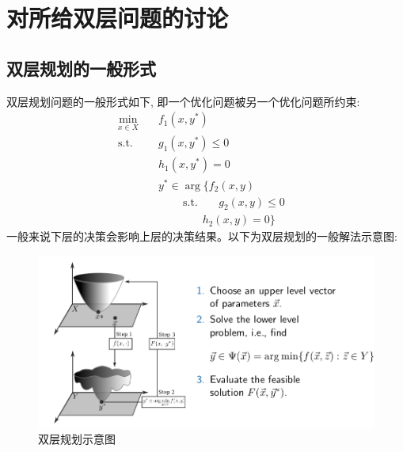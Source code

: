 \documentclass{article}
\begin{document}
\section{对所给双层问题的讨论}
\subsection{双层规划的一般形式}
双层规划问题的一般形式如下, 即一个优化问题被另一个优化问题所约束:
\begin{align}
    \min_{x\in X}\quad & f_1(x,y^{*})&  \\
    \mathrm{s.t.}\quad &g_{1}(x,y^{*})\leq0&  \\
    &h_{1}(x,y^{*})=0& \\
    &y^*\in\mathop{\arg\min_{y\in Y}}\{f_2(x,y) \\
    &\qquad~\mathrm{s.t.}~~~~\quad g_{2}(x,y)\leq0\\
    &~~~~~~~~~~~~~~~~~~h_2(x,y)=0\}
\end{align}
一般来说下层的决策会影响上层的决策结果。以下为双层规划的一般解法示意图:
\begin{figure}[H]
    \centering
    \includegraphics[width=1\textwidth]{./pic/bi-level-scheme.png}
    \caption{双层规划示意图}
    \label{fig:two_level_programming}
\end{figure}
\end{document}
